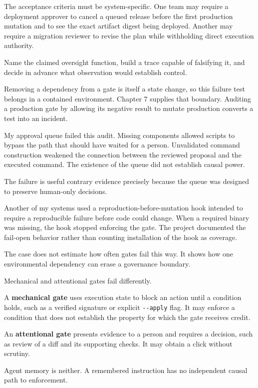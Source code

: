 The acceptance criteria must be system-specific. One team may require a deployment approver to cancel a queued release before the first production mutation and to see the exact artifact digest being deployed. Another may require a migration reviewer to revise the plan while withholding direct execution authority.

Name the claimed oversight function, build a trace capable of falsifying it, and decide in advance what observation would establish control.

Removing a dependency from a gate is itself a state change, so this failure test belongs in a contained environment. Chapter 7 supplies that boundary. Auditing a production gate by allowing its negative result to mutate production converts a test into an incident.

My approval queue failed this audit. Missing components allowed scripts to bypass the path that should have waited for a person. Unvalidated command construction weakened the connection between the reviewed proposal and the executed command. The existence of the queue did not establish causal power.

The failure is useful contrary evidence precisely because the queue was designed to preserve human-only decisions.

Another of my systems used a reproduction-before-mutation hook intended to require a reproducible failure before code could change. When a required binary was missing, the hook stopped enforcing the gate. The project documented the fail-open behavior rather than counting installation of the hook as coverage.

The case does not estimate how often gates fail this way. It shows how one environmental dependency can erase a governance boundary.

Mechanical and attentional gates fail differently.

A \textbf{mechanical gate} uses execution state to block an action until a condition holds, such as a verified signature or explicit \texttt{-\/-apply} flag. It may enforce a condition that does not establish the property for which the gate receives credit.

An \textbf{attentional gate} presents evidence to a person and requires a decision, such as review of a diff and its supporting checks. It may obtain a click without scrutiny.

Agent memory is neither. A remembered instruction has no independent causal path to enforcement.

